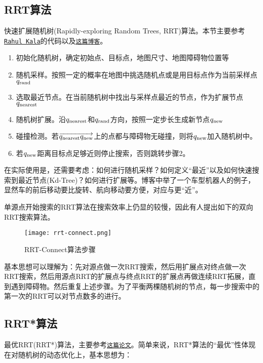 \subsection{RRT算法}
快速扩展随机树(Rapidly-exploring Random Trees, RRT)算法。本节主要参考\href{http://rkala.in/codes/RRT.zip}{\texttt{Rahul Kala}}的代码以及\href{http://www.cnblogs.com/21207-iHome/p/7210543.html}{\texttt{这篇博客}}。


\begin{enumerate}
\item 初始化随机树，确定初始点、目标点，地图尺寸、地图障碍物位置等
\item 随机采样。按照一定的概率在地图中挑选随机点或是用目标点作为当前采样点$q_\rm{rand}$
\item 选取最近节点。在当前随机树中找出与采样点最近的节点，作为扩展节点$q_\rm{nearest}$
\item 随机树扩展。沿$q_\rm{nearest}$和$q_\rm{rand}$方向，按照一定步长生成新节点$q_\rm{new}$
\item 碰撞检测。若$\overrightarrow{q_\rm{nearest} q_\rm{new}}$上的点都与障碍物无碰撞，则将$q_\rm{new}$加入随机树中。
\item 若$q_\rm{new}$距离目标点足够近则停止搜索，否则跳转步骤2。
\end{enumerate}

在实际使用是，还需要考虑：如何进行随机采样？如何定义“最近”以及如何快速搜索到最近节点(Kd-Tree)？如何进行扩展等。博客中举了一个车型机器人的例子，显然车的前后移动要比旋转、航向移动要方便，对应与更“近”。


单源点开始搜索的RRT算法在搜索效率上仍显的较慢，因此有人提出如下的双向RRT搜索算法。
\begin{figure}[htbp]
	\figskip 
	\centering
	\texttt{[image: rrt-connect.png]}	  
	\caption{\label{fig: rrt-connect} RRT-Connect算法步骤}
\end{figure}
基本思想可以理解为：先对源点做一次RRT搜索，然后用扩展点对终点做一次RRT搜索，然后用源点RRT的扩展点与终点RRT的扩展点再做连续RRT拓展，直到遇到障碍物。然后重复上述步骤。为了平衡两棵随机树的节点，每一步搜索中的第一次的RRT可以对节点数多的进行。

\subsection{RRT*算法}
最优RRT(RRT*)算法，主要参考\href{/attachment/Sampling-based Algorithms for Optimal Motion Planning10.1.1.419.5503.pdf}{\texttt{这篇论文}}。简单来说，RRT*算法的“最优”性体现在对随机树的动态优化上，基本思想为：

